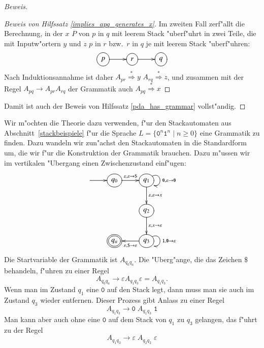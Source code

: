 \begin{proof}[Beweis]
\begin{proof}[Beweis von Hilfssatz \ref{implies_apq_generates_x}]
Im zweiten Fall zerf"allt die Berechnung, in der $x$ $P$ von $p$ in
$q$  mit leerem Stack "uberf"uhrt in zwei Teile, die mit Inputw"ortern
$y$ und $z$ $p$ in $r$ bzw.~$r$ in $q$ je mit leerem Stack "uberf"uhren:
\[
\entrymodifiers={++[o][F]}
\xymatrix{
p\ar[r]
	&r\ar[r]
		&q
}
\]
Nach Induktionsannahme ist daher
$A_{pr}\overset{*}{\Rightarrow}y$
$A_{rq}\overset{*}{\Rightarrow}z$, und zusammen mit der Regel
$A_{pq}\to A_{pr}A_{rq}$ der Grammatik auch
$A_{pq}\overset{*}{\Rightarrow} x$
\end{proof}

Damit ist auch der Beweis von Hilfssatz \ref{pda_has_grammar} vollst"andig.
\end{proof}

\begin{beispiel}
Wir m"ochten die Theorie dazu verwenden, f"ur den Stackautomaten aus
Abschnitt~\ref{stackbeispiele} f"ur die Sprache
$L=\{\texttt{0}^n\texttt{1}^n\;|\; n\ge 0\}$ eine Grammatik zu finden.
Dazu wandeln wir zun"achst den Stackautomaten in die Standardform um, die
wir f"ur die Konstruktion der Grammatik brauchen. Dazu m"ussen wir
im vertikalen "Ubergang einen Zwischenzustand einf"ugen:
\[
\entrymodifiers={++[o][F]}
\xymatrix{
*+\txt{}\ar[r]
	&{q_0}\ar[r]^{\varepsilon,\varepsilon\to{\tt \$}}
		&{q_1} \ar@(ur,dr)^{{\tt 0},\varepsilon\to{\tt 0}}
		    \ar[d]^{\varepsilon,\varepsilon\to x}
\\
*+\txt{}
	&*+\txt{}
		&{q_2}\ar[d]^{\varepsilon,x\to\varepsilon}
\\
*+\txt{}
	&*++[o][F=]{q_a}
		&{q_3}\ar[l]^{\varepsilon,{\tt \$}\to\varepsilon}
		   \ar@(ur,dr)^{{\tt 1},{\tt 0}\to\varepsilon}
}
\]
Die Startvariable der Grammatik ist $A_{q_0q_a}$. Die "Uberg"ange, die
das Zeichen $\texttt{\$}$ behandeln, f"uhren zu einer Regel
\begin{equation}
A_{q_0q_a}\to \varepsilon A_{q_1q_3}\varepsilon = A_{q_1q_3}.
\label{q0qa}
\end{equation}
Wenn man im Zustand $q_1$ eine $\texttt{0}$ auf den Stack legt, dann
muss man sie auch im Zustand $q_3$ wieder entfernen. Dieser Prozess
gibt Anlass zu einer Regel
\begin{equation}
A_{q_1q_3}\to \texttt{0}\; A_{q_1q_3}\;\texttt{1}
\label{q1q3}
\end{equation}
Man kann aber auch ohne eine $\texttt{0}$ auf dem Stack von
$q_1$ zu $q_3$ gelangen, das f"uhrt zu der Regel 
\begin{equation}
A_{q_1q_3}\to \varepsilon\; A_{q_2q_2}\;\varepsilon
\label{q2q2}
\end{equation}

\end{beispiel}
